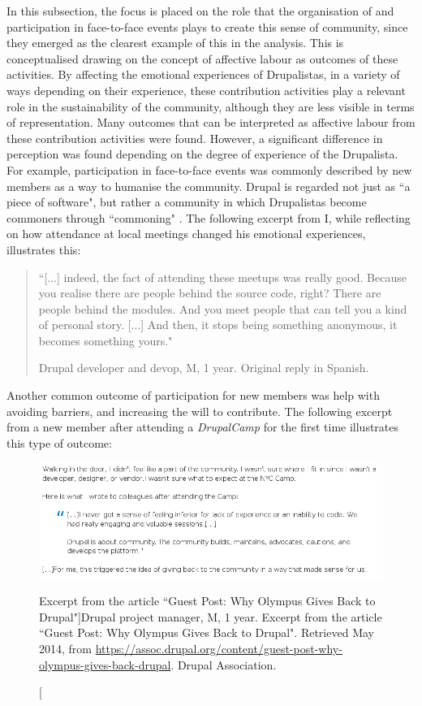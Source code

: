 In this subsection, the focus is placed on the role that the organisation of and participation in face-to-face events plays to create this sense of community, since they emerged as the clearest example of this in the analysis. This is conceptualised drawing on the concept of affective labour \parencite{hardt1999affective} as outcomes of these activities. By affecting the emotional experiences of Drupalistas, in a variety of ways depending on their experience,  these contribution activities play a relevant role in the sustainability of the community, although they are less visible in terms of representation. Many outcomes that can be interpreted as affective labour from these contribution activities were found. However, a significant difference in perception was found depending on the degree of experience of the Drupalista. For example, participation in face-to-face events was commonly described by new members as a way to humanise the community. Drupal is regarded not just as ``a piece of software", but rather a community in which Drupalistas become commoners through ``commoning" \parencite{linebaugh2008magna}. The following excerpt from I, while reflecting on how attendance at local meetings changed his emotional experiences, illustrates this:

\begin{quotation}
    ``[...] indeed, the fact of attending these meetups was really good. Because you realise there are people behind the source code, right? There are people behind the modules. And you meet people that can tell you a kind of personal story. [...] And then, it stops being something anonymous, it becomes something yours."

\begin{flushright}\footnotesize{Drupal developer and devop, M, 1 year. Original reply in Spanish.}\end{flushright}
\end{quotation}

Another common outcome of participation for new members was help with avoiding barriers, and increasing the will to contribute. The following excerpt from a new member after attending a \textit{DrupalCamp} for the first time illustrates this type of outcome:

\begin{figure}[H]
    \centering
\includegraphics[scale=0.51]{img/quotes_replacement/quote_olympus.png}
    \caption[Excerpt from the article ``Guest Post: Why Olympus Gives Back to Drupal"]{Drupal project manager, M, 1 year. Excerpt from the article ``Guest Post: Why Olympus Gives Back to Drupal". Retrieved  May 2014, from \url{https://assoc.drupal.org/content/guest-post-why-olympus-gives-back-drupal}. Drupal Association.}
    \label{quote_olympus}
\end{figure}

